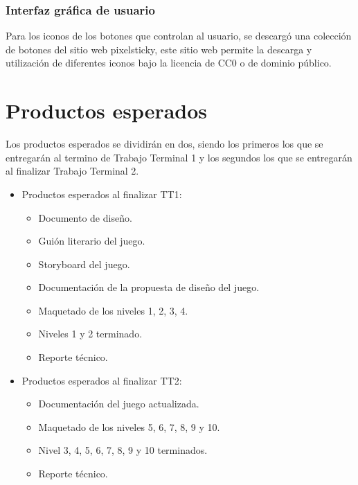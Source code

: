 		\subsubsection{Interfaz gráfica de usuario}
	Para los iconos de los botones que controlan al usuario, se descargó una colección 
	de botones del sitio web pixelsticky, este sitio web permite la descarga y 
	utilización de diferentes iconos bajo la licencia de CC0 o de dominio público.
	
	\section{Productos esperados}\label{Sec_Producto}
	Los productos esperados se dividirán en dos, siendo los primeros los que se 
	entregarán al termino de Trabajo Terminal 1 y los segundos los que se entregarán
	 al finalizar Trabajo Terminal 2.
	
	\begin{itemize}
		\item Productos esperados al finalizar TT1:
			\begin{itemize}
				\item Documento de diseño.
				\item Guión literario del juego.
				\item Storyboard del juego.
				\item Documentación de la propuesta de diseño del juego.
				\item Maquetado de los niveles 1, 2, 3, 4.
				\item Niveles 1 y 2 terminado.
				\item Reporte técnico.
			\end{itemize}
		\item Productos esperados al finalizar TT2:
			\begin{itemize}
				\item Documentación del juego actualizada.
				\item Maquetado de los niveles 5, 6, 7, 8, 9 y 10.
				\item Nivel 3, 4, 5, 6, 7, 8, 9 y 10 terminados.
				\item Reporte técnico.
			\end{itemize}
	\end{itemize}